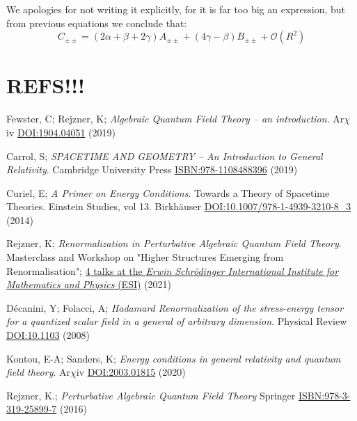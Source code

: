 \documentclass[a4paper,11pt]{article}
\numberwithin{equation}{section}
\theoremstyle{definition}
\begin{document}
We apologies for not writing it explicitly, for it is far too big an expression, but from \color{red} previous equations \color{black} we conclude that:
\begin{equation}
    \boxed{C_{\pm\pm} = (2\alpha + \beta + 2\gamma) A_{\pm\pm} +(4\gamma- \beta)B_{\pm\pm} + \mathcal{O}(R^2)}
\end{equation}


\newpage 
\section{REFS!!!}
\begin{thebibliography}{99}

    Fewster, C; Rejzner, K; \textit{Algebraic Quantum Field Theory -- an introduction}. Ar$\chi$iv \href{https://arxiv.org/abs/1904.04051}{DOI:1904.04051} (2019)

    Carrol, S; \textit{SPACETIME AND GEOMETRY -- An Introduction to General Relativity}. Cambridge University Press \href{https://www.cambridge.org/highereducation/books/spacetime-and-geometry/38EDABF9E2BADCE6FBCF2B22DC12BFFE#overview}{ISBN:978-1108488396} (2019)

    Curiel, E; \textit{A Primer on Energy Conditions}. Towards a Theory of Spacetime Theories. Einstein Studies, vol 13. Birkhäuser \href{https://arxiv.org/abs/1405.0403}{DOI:10.1007/978-1-4939-3210-8\_3} (2014)

    Rejzner, K; \textit{Renormalization in Perturbative Algebraic Quantum Field Theory}. Masterclass and Workshop on "Higher Structures Emerging from Renormalisation"; \href{https://www.youtube.com/watch?v=3JVDJhFpuPY&ab_channel=ErwinSchr%C3%B6dingerInternationalInstituteforMathematicsandPhysics%28ESI%29}{4 talks at the \textit{Erwin Schrödinger International Institute for Mathematics and Physics} (ESI)} (2021)

    Décanini, Y; Folacci, A; \textit{Hadamard Renormalization of the stress-energy tensor for a quantized scalar field in a general of arbitrary dimension}. Physical Review \href{https://arxiv.org/abs/gr-qc/0512118}{DOI:10.1103} (2008)

     Kontou, E-A; Sanders, K; \textit{Energy conditions in general relativity and quantum field theory}. Ar$\chi$iv \href{https://arxiv.org/abs/2003.01815}{DOI:2003.01815} (2020)

    Rejzner, K.; \textit{Perturbative Algebraic Quantum Field Theory} Springer \href{https://link.springer.com/book/10.1007/978-3-319-25901-7}{ISBN:978-3-319-25899-7} (2016)


\end{thebibliography}
\end{document}
